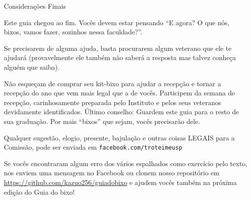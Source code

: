 \begin{secao}{Considerações Finais}

Este guia chegou ao fim. Vocês devem estar pensando ``E agora? O que nós, bixos,
vamos fazer, sozinhos nessa faculdade?''.

Se precisarem de alguma ajuda, basta procurarem algum veterano que ele te
ajudará (provavelmente ele também não saberá a resposta mas talvez conheça alguém que saiba).

Não esqueçam de comprar seu kit-bixo para ajudar a recepção e tornar a recepção
do ano que vem mais legal que a de vocês. Participem da semana de recepção,
carinhosamente preparada pelo Instituto e pelos seus veteranos devidamente
identificados. Último conselho: Guardem este guia para o resto de sua graduação.
Por mais ``bixos'' que sejam, vocês precisarão dele.

Qualquer sugestão, elogio, presente, bajulação e outras coisas LEGAIS para a
Comissão, pode ser enviada em {\tt facebook.com/troteimeusp}

Se vocês encontraram algum erro dos vários espalhados como exercício pelo texto,
nos enviem uma mensagem no Facebook ou clonem nosso repositório em
\url{https://github.com/kazuo256/guiadobixo} e ajudem vocês também na próxima
edição do Guia do bixo!

\end{secao}
